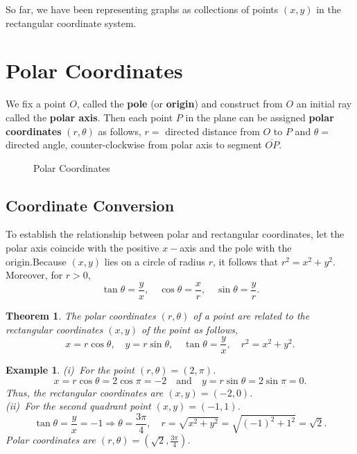 \documentclass[titlepage,a4paper,12pt]{report}
\newtheorem{example}{Example}[section]
\newtheorem{theorem}{Theorem}[section]
\begin{document}
\noindent So far, we have been representing graphs as collections of points $(x,y)$ in the rectangular coordinate system. 
\section{Polar Coordinates}
We fix a point $O$, called the \textbf{pole} (or \textbf{origin}) and construct from $O$ an initial ray called the \textbf{polar axis}. Then each point $P$ in the plane can be assigned \textbf{polar coordinates} $(r, \theta)$ as follows, $r=$ directed distance from $O$ to $P$ and $\theta =$ directed angle, counter-clockwise from polar axis to segment $\overline{OP}$.
\begin{figure}[h!]

\caption{Polar Coordinates}
\end{figure}
\subsection{Coordinate Conversion}
To establish the relationship between polar and rectangular coordinates, let the polar axis coincide with the positive $x-$axis and the pole with the origin.Because $(x,y)$ lies on a circle of radius $r$, it follows that $r^2=x^2+y^2$. Moreover, for $r>0$, 
\[\tan \theta =\dfrac{y}{x}, \quad \cos \theta =\dfrac{x}{r}, \quad \sin \theta = \dfrac{y}{r}.\]
\begin{theorem}
The polar coordinates $(r, \theta)$ of a point are related to the rectangular coordinates $(x,y)$ of the point as follows, 
\[x=r\cos \theta , \quad y=r\sin \theta , \quad \tan \theta =\dfrac{y}{x}, \quad r^2=x^2+y^2.\]
\end{theorem}
\begin{example}
(i)\, For the point $(r, \theta)=(2, \pi)$. 
\[x=r\cos \theta =2 \cos \pi =-2 \quad \mbox{and} \quad y=r\sin \theta = 2\sin \pi =0.\] Thus, the rectangular coordinates are $(x,y)=(-2,0)$.\\
(ii)\, For the second quadrant point $(x,y)=(-1,1)$.
\[\tan \theta =\dfrac{y}{x}=-1\Longrightarrow \theta = \dfrac{3\pi}{4}, \quad r=\sqrt{x^2+y^2}=\sqrt{(-1)^2+1^2}=\sqrt{2}.\] Polar coordinates are $(r, \theta)=(\sqrt{2}, \frac{3\pi}{4})$.
\end{example}
\end{document}
